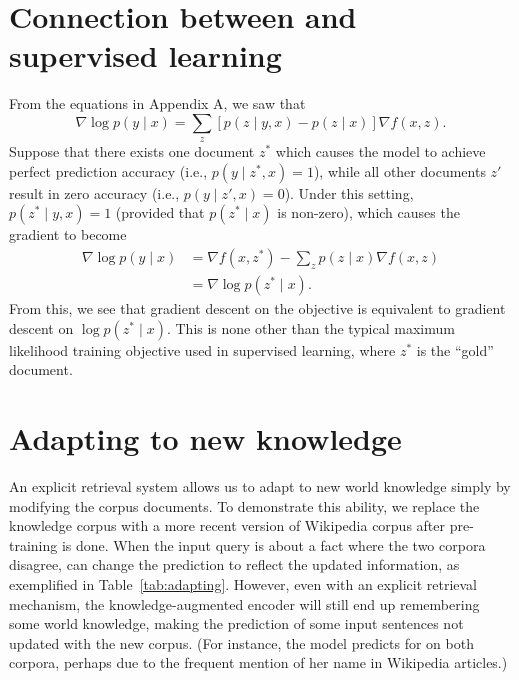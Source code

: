 \documentclass{article}
\begin{document}
\section{Connection between \thename and supervised learning}
From the equations in Appendix A, we saw that 
\[
\nabla\log p\left(y\mid x\right)=\sum_{z}\left[p\left(z\mid y,x\right)-p\left(z\mid x\right)\right]\nabla f(x,z).
\]
Suppose that there exists one document $z^{*}$ which causes the model
to achieve perfect prediction accuracy (i.e., $p\left(y\mid z^{*},x\right)=1$), while all other documents $z'$ result in zero accuracy (i.e., $p\left(y\mid z',x\right)=0$).
Under this setting, $p\left(z^{*}\mid y,x\right)=1$ (provided that
$p\left(z^{*}\mid x\right)$ is non-zero), which causes the gradient
to become
\begin{align*}
\nabla\log p\left(y\mid x\right) & =\nabla f\left(x,z^{*}\right)-\sum_{z}p\left(z\mid x\right)\nabla f(x,z)\\
 & =\nabla\log p\left(z^{*}\mid x\right).
\end{align*}
From this, we see that gradient descent on the \thename objective is
equivalent to gradient descent on $\log p\left(z^{*}\mid x\right)$.
This is none other than the typical maximum likelihood training objective
used in supervised learning, where $z^{*}$ is the ``gold'' document.


\section{Adapting to new knowledge}

An explicit retrieval system allows us to adapt to new world knowledge
simply by modifying the corpus documents.
To demonstrate this ability,
we replace the knowledge corpus with a more recent version of Wikipedia corpus after pre-training is done.
When the input query is about a fact where the two corpora disagree,
\thename can change the prediction to reflect the updated information,
as exemplified in Table~\ref{tab:adapting}.
However, even with an explicit retrieval mechanism,
the knowledge-augmented encoder will still end up remembering some world knowledge,
making the prediction of some input sentences not updated with the new corpus.
(For instance, the model predicts  for  on both corpora, perhaps due to the frequent mention of her name in Wikipedia articles.)
\end{document}
